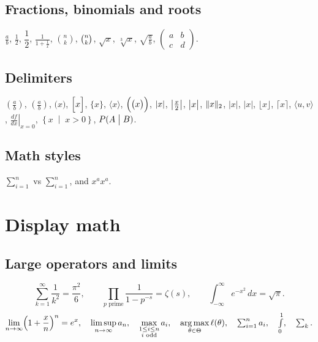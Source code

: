 \documentclass[11pt,letterpaper]{article}
\theoremstyle{definition}
\theoremstyle{remark}
\DeclareMathOperator*{\argmax}{arg\,max}
\DeclarePairedDelimiter{\abs}{\lvert}{\rvert}
\DeclarePairedDelimiter{\norm}{\lVert}{\rVert}
\begin{document}
\subsection{Fractions, binomials and roots}

$\frac{a}{b}$, $\tfrac{1}{2}$, $\dfrac{1}{2}$, $\frac{1}{1 + \frac{1}{x}}$, $\binom{n}{k}$, $\tbinom{n}{k}$, $\sqrt{x}$, $\sqrt[3]{x}$, $\sqrt{\frac{a}{b}}$, $\left(\begin{smallmatrix} a & b \\ c & d \end{smallmatrix}\right)$.

\subsection{Delimiters}

$(\frac{a}{b})$, $\left(\frac{a}{b}\right)$, $\bigl(x\bigr)$, $\Bigl[x\Bigr]$, $\biggl\{x\biggr\}$, $\Biggl\langle x\Biggr\rangle$, $\Bigl(\bigl(x\bigr)\Bigr)$, $\abs{x}$, $\abs*{\frac{x}{2}}$, $\abs[\big]{x}$, $\norm{x}_2$, $\lvert x \rvert$, $|x|$, $\lfloor x \rfloor$, $\lceil x \rceil$, $\langle u, v \rangle$, $\left. \frac{df}{dx} \right|_{x=0}$, $\left\{ x \;\middle|\; x > 0 \right\}$, $P(A \bigm| B)$.

\subsection{Math styles}

$\textstyle\sum_{i=1}^n$ vs $\displaystyle\sum_{i=1}^n$, and $x^{\scriptstyle a} x^{\scriptscriptstyle a}$.


\section{Display math}

\subsection{Large operators and limits}

\[ \sum_{k=1}^{\infty} \frac{1}{k^2} = \frac{\pi^2}{6}, \qquad \prod_{p \text{ prime}} \frac{1}{1 - p^{-s}} = \zeta(s), \qquad \int_{-\infty}^{\infty} e^{-x^2}\,dx = \sqrt{\pi}. \]
\[ \lim_{n \to \infty} \Bigl(1 + \frac{x}{n}\Bigr)^n = e^x, \quad \limsup_{n \to \infty} a_n, \quad \max_{\substack{1 \leq i \leq n \\ i \text{ odd}}} a_i, \quad \argmax_{\theta \in \Theta} \ell(\theta), \quad \textstyle\sum_{i=1}^n a_i, \quad \int\limits_0^1, \quad \sum\nolimits_k. \]
\end{document}

